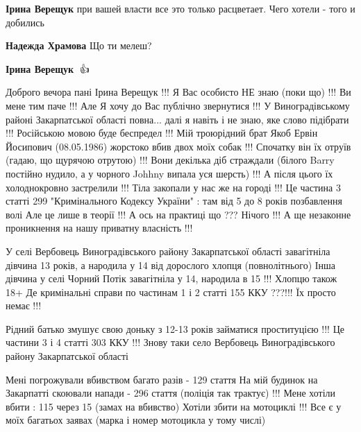 \begin{itemize}
\begin{itemize}
\textbf{Ірина Верещук} при вашей власти все это только расцветает. Чего хотели - того и добились

 
\textbf{Надежда Храмова} Що ти мелеш?

 
\textbf{Ірина Верещук} 🤝👍


Доброго вечора пані Ірина Верещук !!! Я Вас особисто НЕ знаю (поки що) !!! Ви
мене тим паче !!! Але Я хочу до Вас публічно звернутися !!! У Виноградівському
районі Закарпатської області повна... далі я навіть і не знаю, яке слово
підібрати !!! Російською мовою буде беспредел !!! Мій троюрідний брат Якоб
Ервін Йосипович (08.05.1986) жорстоко вбив двох моїх собак !!!  Спочатку він їх
отруїв (гадаю, що щурячою отрутою) !!! Вони декілька діб страждали (білого
Barry постійно нудило, а у чорного Johhny випала уся шерсть) !!!  А після цього
їх холоднокровно застрелили !!! Тіла закопали у нас же на городі !!! Це частина
3 статті 299 "Кримінального Кодексу України" : там від 5 до 8 років позбавлення
волі Але це лише в теорії !!! А ось на практиці що ??? Нічого !!!  А ще
незаконне проникнення на нашу приватну власність !!!

У селі Вербовець Виноградівського району Закарпатської області завагітніла
дівчина 13 років, а народила у 14 від дорослого хлопця (повнолітнього) Інша
дівчина у селі Чорний Потік завагітніла у 14, народила в 15 !!!  Хлопцю також
18+ Де кримінальні справи по частинам 1 і 2 статті 155 ККУ ???!!! Їх просто
немає !!!

Рідний батько змушує свою доньку з 12-13 років займатися проституцією !!! Це
частини 3 і 4 статті 303 ККУ !!! Знову таки село Вербовець Виноградівського
району Закарпатської області

Мені погрожували вбивством багато разів - 129 стаття На мій будинок на
Закарпатті скоювали напади - 296 стаття (поліція так трактує) !!! Мене хотіли
вбити : 115 через 15 (замах на вбивство) Хотіли збити на мотоциклі !!! Все є у
моїх багатьох заявах (марка і номер мотоцикла у тому числі)


\end{itemize}
\end{itemize}
